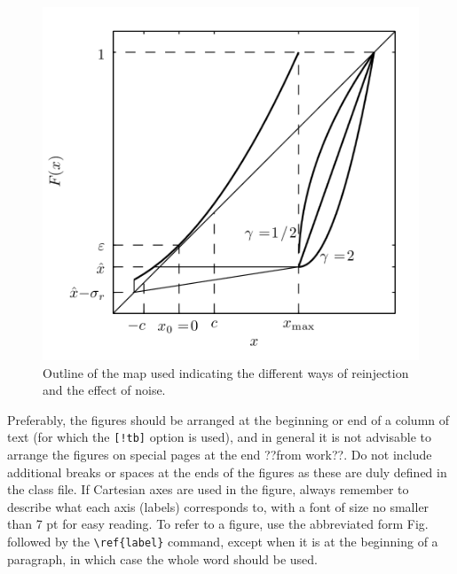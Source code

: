 \begin{figure}[!tb] 
 \centering
 \includegraphics[width=.8\columnwidth]{figura1} 
 \caption{Outline of the map used indicating the different ways of reinjection and the effect of noise.} \label{fig-1}
\end{figure}

Preferably, the figures should be arranged at the beginning or end of a column of text (for which the \texttt{[!tb]} option is used), and in general it is not advisable to arrange the figures on special pages at the end ??from work??. Do not include additional breaks or spaces at the ends of the figures as these are duly defined in the class file. If Cartesian axes are used in the figure, always remember to describe what each axis (labels) corresponds to, with a font of size no smaller than 7 pt for easy reading. To refer to a figure, use the abbreviated form Fig. followed by the \verb!\ref{label}! command, except when it is at the beginning of a paragraph, in which case the whole word should be used.


